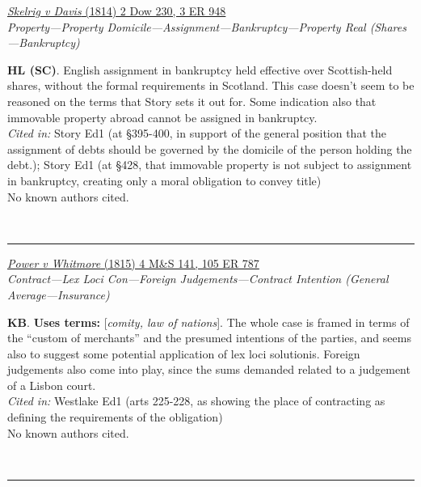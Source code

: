 \documentclass[twoside]{article}
\begin{document}
        \begin{small}
        \begin{center}
        \href{https://heinonline.org/HOL/P?h=hein.engrep/engra0003&i=856}{\textit{Skelrig v Davis} (1814) 2 Dow 230, 3 ER 948} \label{126} \\ 
\textit{Property---Property Domicile---Assignment---Bankruptcy---Property Real (Shares---Bankruptcy)}\\
        \end{center}
        \textbf{HL (SC)}. English assignment in bankruptcy held effective over Scottish-held shares, without the formal requirements in Scotland. This case doesn’t seem to be reasoned on the terms that Story sets it out for. Some indication also that immovable property abroad cannot be assigned in bankruptcy.\\\textit{Cited in: }Story Ed1 (at §395-400, in support of the general position that the assignment of debts should be governed by the domicile of the person holding the debt.); Story Ed1 (at §428, that immovable property is not subject to assignment in bankruptcy, creating only a moral obligation to convey title)\\No known authors cited.
        \end{small}\\
        \rule{\textwidth}{0.5pt}
        

        \begin{small}
        \begin{center}
        \href{https://heinonline.org/HOL/P?h=hein.engrep/engrf0105&i=791}{\textit{Power v Whitmore} (1815) 4 M\&S 141, 105 ER 787} \label{34} \\ 
\textit{Contract---Lex Loci Con---Foreign Judgements---Contract Intention (General Average---Insurance)}\\
        \end{center}
        \textbf{KB}.  \textbf{Uses terms: }[\textit{comity, law of nations}]. The whole case is framed in terms of the “custom of merchants” and the presumed intentions of the parties, and seems also to suggest some potential application of lex loci solutionis. Foreign judgements also come into play, since the sums demanded related to a judgement of a Lisbon court.\\\textit{Cited in: }Westlake Ed1 (arts 225-228, as showing the place of contracting as defining the requirements of the obligation)\\No known authors cited.
        \end{small}\\
        \rule{\textwidth}{0.5pt}
        
\end{document}
